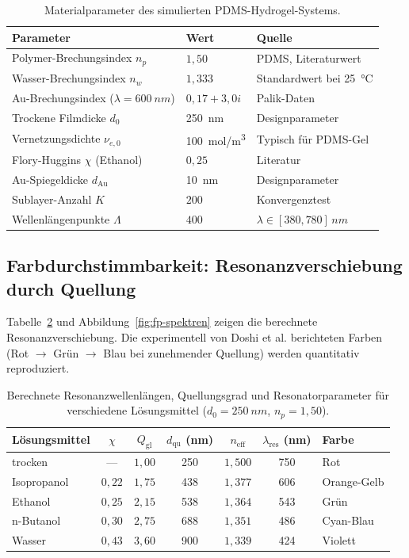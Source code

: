 ﻿\documentclass[a4paper,12pt]{article}
\theoremstyle{definition}
\newcommand{\neff}{n_\mathrm{eff}}
\begin{document}
	\begin{table}[htb]
		\centering
		\caption{Materialparameter des simulierten PDMS-Hydrogel-Systems.}
		\label{tab:parameter}
		\begin{tabular}{lll}
			\toprule
			\textbf{Parameter} & \textbf{Wert} & \textbf{Quelle}\\
			\midrule
			Polymer-Brechungsindex $n_p$ & $1{,}50$ & PDMS, Literaturwert\\
			Wasser-Brechungsindex $n_w$ & $1{,}333$ & Standardwert bei \SI{25}{\celsius}\\
			Au-Brechungsindex ($\lambda = \SI{600}{nm}$) & $0{,}17 + 3{,}0i$ & Palik-Daten\\
			Trockene Filmdicke $d_0$ & \SI{250}{nm} & Designparameter\\
			Vernetzungsdichte $\nu_{e,0}$ & \SI{100}{mol/m^3} & Typisch für PDMS-Gel\\
			Flory-Huggins $\chi$ (Ethanol) & $0{,}25$ & Literatur\\
			Au-Spiegeldicke $d_\mathrm{Au}$ & \SI{10}{nm} & Designparameter\\
			Sublayer-Anzahl $K$ & $200$ & Konvergenztest\\
			Wellenlängenpunkte $\Lambda$ & $400$ & $\lambda \in [380, 780]\,\si{nm}$\\
			\bottomrule
		\end{tabular}
	\end{table}
	
	\subsection{Farbdurchstimmbarkeit: Resonanzverschiebung durch Quellung}
	
	Tabelle~\ref{tab:farbtuning} und Abbildung~\ref{fig:fp-spektren} zeigen
	die berechnete Resonanzverschiebung. Die experimentell von Doshi et al.
	berichteten Farben (Rot $\to$ Grün $\to$ Blau bei zunehmender Quellung)
	werden quantitativ reproduziert.
	
	\begin{table}[htb]
		\centering
		\caption{Berechnete Resonanzwellenlängen, Quellungsgrad und
			Resonatorparameter für verschiedene Lösungsmittel ($d_0 = \SI{250}{nm}$,
			$n_p = 1{,}50$).}
		\label{tab:farbtuning}
		\begin{tabular}{lcccccl}
			\toprule
			\textbf{Lösungsmittel} & $\chi$ & $Q_\mathrm{gl}$ & $d_\mathrm{qu}$ (nm)
			& $\neff$ & $\lambda_\mathrm{res}$ (nm) & \textbf{Farbe}\\
			\midrule
			trocken & --- & $1{,}00$ & 250 & $1{,}500$ & 750 & Rot\\
			Isopropanol & $0{,}22$ & $1{,}75$ & 438 & $1{,}377$ & 606 & Orange-Gelb\\
			Ethanol & $0{,}25$ & $2{,}15$ & 538 & $1{,}364$ & 543 & Grün\\
			n-Butanol & $0{,}30$ & $2{,}75$ & 688 & $1{,}351$ & 486 & Cyan-Blau\\
			Wasser & $0{,}43$ & $3{,}60$ & 900 & $1{,}339$ & 424 & Violett\\
			\bottomrule
		\end{tabular}
	\end{table}
	
\end{document}
